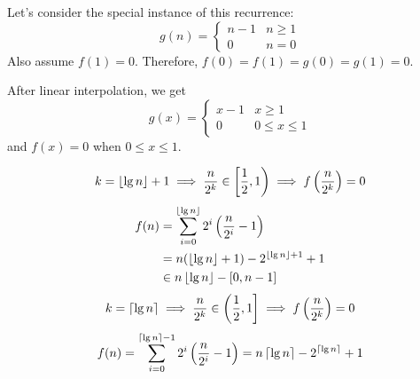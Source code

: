 Let's consider the special instance of this recurrence:
\[ g(n) = \begin{cases}n-1 & n \ge 1 \\ 0 & n = 0 \end{cases} \]
Also assume $f(1) = 0$. Therefore, $f(0) = f(1) = g(0) = g(1) = 0$.

After linear interpolation, we get
\[ g(x) = \begin{cases}x-1 & x \ge 1 \\ 0 & 0 \le x \le 1 \end{cases} \]
and $f(x) = 0$ when $0 \le x \le 1$.

\[ k = \left\lfloor \lg n \right\rfloor + 1
\implies \frac{n}{2^k} \in \left[\frac{1}{2}, 1\right)
\implies f\left(\frac{n}{2^k}\right) = 0 \]
\begin{align*}
f(n) &= \sum_{i=0}^{\left\lfloor \lg n \right\rfloor} 2^i \left( \frac{n}{2^i} - 1 \right)
\\ &= n(\left\lfloor \lg n \right\rfloor + 1) - 2^{\left\lfloor \lg n \right\rfloor + 1} + 1
\\ &\in n\left\lfloor \lg n \right\rfloor - [0, n-1]
\end{align*}
\[ k = \left\lceil \lg n \right\rceil
\implies \frac{n}{2^k} \in \left(\frac{1}{2}, 1\right]
\implies f\left(\frac{n}{2^k}\right) = 0 \]
\[ f(n) = \sum_{i=0}^{\left\lceil \lg n \right\rceil-1} 2^i \left( \frac{n}{2^i} - 1 \right)
= n\left\lceil \lg n \right\rceil - 2^{\left\lceil \lg n \right\rceil} + 1 \]

\addMyBib{}


